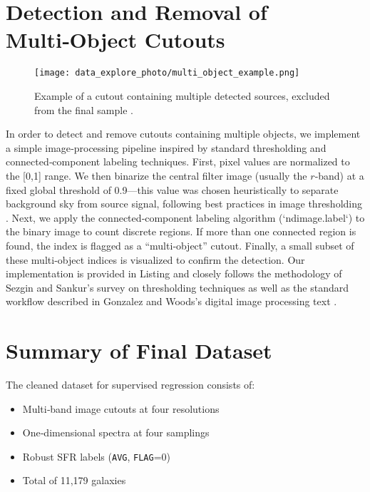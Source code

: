 \documentclass[english,bachelor,oneside]{ctufit-thesis}
\begin{document}
\section{Detection and Removal of Multi‑Object Cutouts}
\begin{figure}[H]
    \centering
    \texttt{[image: data\_explore\_photo/multi\_object\_example.png]}
    \caption{Example of a cutout containing multiple detected sources, excluded from the final sample \cite{data_exploring} .}
    \label{fig:multi_object_example}
\end{figure}
\noindent In order to detect and remove cutouts containing multiple objects, we implement a simple image‐processing pipeline inspired by standard thresholding and connected‐component labeling techniques. First, pixel values are normalized to the [0,1] range. We then binarize the central filter image (usually the $r$‐band) at a fixed global threshold of 0.9—this value was chosen heuristically to separate background sky from source signal, following best practices in image thresholding \cite{sezgin2004survey}. Next, we apply the connected‐component labeling algorithm (`ndimage.label`) to the binary image to count discrete regions. If more than one connected region is found, the index is flagged as a “multi‐object” cutout. Finally, a small subset of these multi‐object indices is visualized to confirm the detection. Our implementation is provided in Listing \cite{data_exploring} and closely follows the methodology of Sezgin and Sankur’s survey on thresholding techniques \cite{sezgin2004survey} as well as the standard workflow described in Gonzalez and Woods’s digital image processing text \cite{GonzalezWoods2008}.


\section{Summary of Final Dataset}
The cleaned dataset for supervised regression consists of:
\begin{itemize}
  \item Multi‑band image cutouts at four resolutions
  \item One‑dimensional spectra at four samplings
  \item Robust SFR labels (\texttt{AVG}, \texttt{FLAG}=0)
  \item Total of 11,179 galaxies
\end{itemize}

\end{document}
